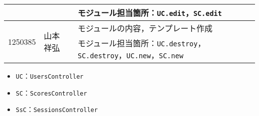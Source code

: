 \begin{table}[h]
\begin{tabularx}{\textwidth}{cll}
		                         &                        & モジュール担当箇所：\texttt{UC.edit}，\texttt{SC.edit}                                       \\
		\hline
		\multirow{2}{*}{1250385} & \multirow{2}{*}{山本 祥弘} & モジュールの内容，テンプレート作成                                                                 \\
		                         &                        & モジュール担当箇所：\texttt{UC.destroy}，\texttt{SC.destroy}，\texttt{UC.new}，\texttt{SC.new} \\
		\hline
	\end{tabularx}
\end{table}
\begin{itemize}
	\item \texttt{UC}：\texttt{UsersController}
	\item \texttt{SC}：\texttt{ScoresController}
	\item \texttt{SsC}：\texttt{SessionsController}
\end{itemize}